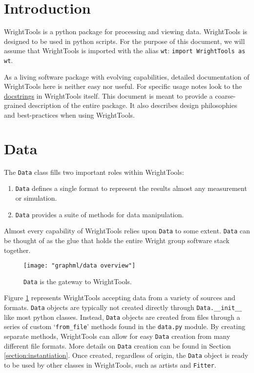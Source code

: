 
\section{Introduction}

WrightTools is a python package for processing and viewing data. WrightTools is designed to be used in python scripts. For the purpose of this document, we will assume that WrightTools is imported with the alias \texttt{wt}: \texttt{import WrightTools as wt}.


As a living software package with evolving capabilities, detailed documentation of WrightTools here is neither easy nor useful. For specific usage notes look to the \href{https://www.python.org/dev/peps/pep-0257/#what-is-a-docstring}{docstrings} in WrightTools itself. This document is meant to provide a coarse-grained description of the entire package. It also describes design philosophies and best-practices when using WrightTools.

\pagebreak
\section{Data}

The \texttt{Data} class fills two important roles within WrightTools:
\begin{enumerate}
	\item \texttt{Data} defines a single format to represent the results almost any measurement or simulation.
	\item \texttt{Data} provides a suite of methods for data manipulation.
\end{enumerate}
Almost every capability of WrightTools relies upon \texttt{Data} to some extent. \texttt{Data} can be thought of as the glue that holds the entire Wright group software stack together.

\begin{figure}[h]\label{fig:data overview}
	\begin{centering}
		\texttt{[image: "graphml/data overview"]}
		\caption{\texttt{Data} is the gateway to WrightTools.}
	\end{centering}
\end{figure}

Figure \ref{fig:data overview} represents WrightTools accepting data from a variety of sources and formats. \texttt{Data} objects are typically not created directly through \texttt{Data.\_\_init\_\_} like most python classes. Instead, \texttt{Data} objects are created from files through a series of custom `\texttt{from\_file}' methods found in the \texttt{data.py} module. By creating separate methods, WrightTools can allow for easy \texttt{Data} creation from many different file formats. More details on \texttt{Data} creation can be found in Section \ref{section:instantiation}. Once created, regardless of origin, the \texttt{Data} object is ready to be used by other classes in WrightTools, such as artists and \texttt{Fitter}.





